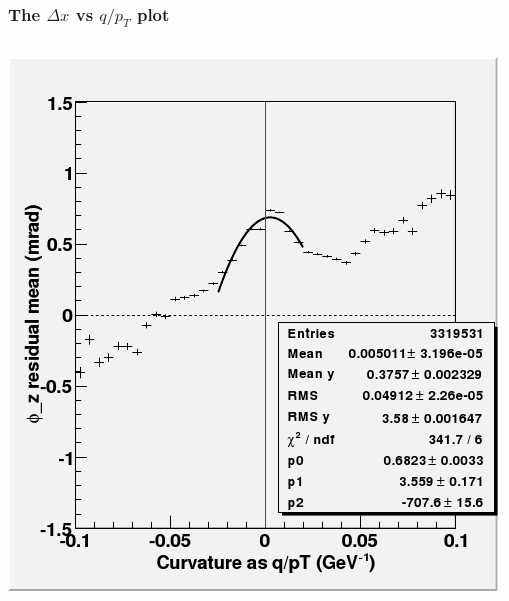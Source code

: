 \documentclass[compress]{beamer}
\begin{document}
\begin{frame}
\frametitle{The $\Delta x$ vs $q/p_T$ plot}

\begin{columns}
\includegraphics[width=\linewidth]{old_Deltax_vs_qoverpT.png}


\end{columns}
\end{frame}
\end{document}
